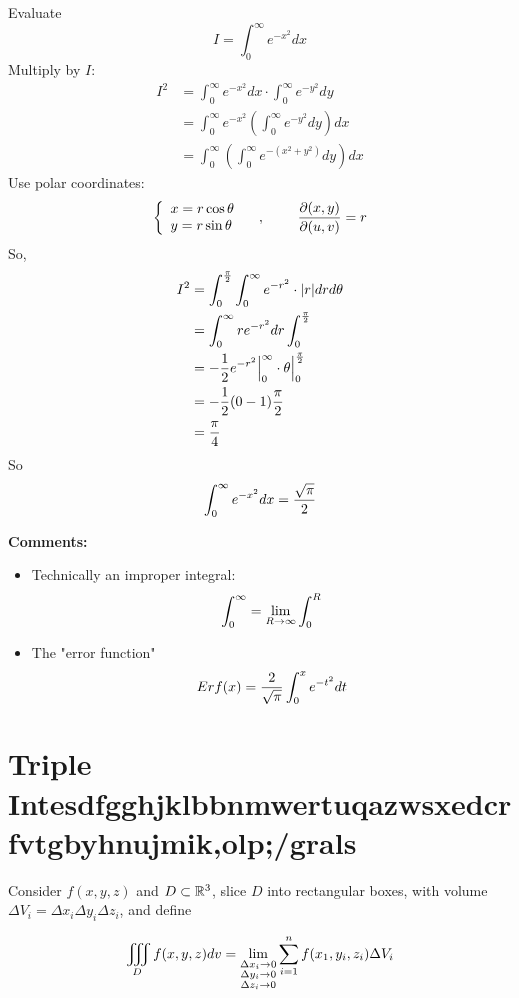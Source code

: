 \documentclass[english, 11pt]{article}
\begin{document}
\begin{exmp}
  Evaluate
  \[ I = \int_0^{\infty} e^{-x^2} dx \]
  Multiply by $I$:
  \begin{align*}
    I^2 & =  \int_0^{\infty} e^{-x^2} dx \cdot  \int_0^{\infty} e^{-y^2} dy \\
    & = \int_0^{\infty} e^{-x^2} \left( \int_0^{\infty} e^{-y^2} dy \right) dx \\
    & = \int_0^{\infty} \left( \int_0^{\infty} e^{-(x^2 + y^2)} dy \right) dx
  \end{align*}
  Use polar coordinates:
  \[ \left\{ \begin{array}{lr} x = r\cos\theta & \mbox{} \\ y = r\sin\theta & \mbox{} \end{array} \right., \ \ \ \ \ \ \ \frac{\partial(x,y)}{\partial(u,v)} = r \]
  So,
  \begin{align*}
    I^2 & = \int_0^{\frac{\pi}{2}} \int_0^{\infty} e^{-r^2} \cdot |r| dr d\theta \\
        & = \int_0^{\infty}re^{-r^2}dr \int_0^{\frac{\pi}{2}} \\
        & = -\frac{1}{2}e^{-r^2}\Big|_0^{\infty} \cdot \theta \Big|_0^{\frac{\pi}{2}} \\
        & = -\frac{1}{2}(0 - 1)\frac{\pi}{2} \\
        & = \frac{\pi}{4}
  \end{align*}
  So \[ \int_0^{\infty} e^{-x^2} dx = \frac{\sqrt{\pi}}{2} \]
\end{exmp}

\textbf{Comments:}

\begin{itemize}
  \item Technically an improper integral:
  \[ \int_0^{\infty}= \lim_{R \rightarrow \infty} \int_0^R \]
  \item The "error function"
  \[ Erf(x) = \frac{2}{\sqrt{\pi}}\int_0^x e^{-t^2}dt  \]
\end{itemize}

\section{Triple Intesdfgghjklbbnmwertuqazwsxedcrfvtgbyhnujmik,olp;/grals}
\newcommand{\Iiint}{\iiint\displaylimits}
Consider $f(x,y,z)$ and $D\subset {\mathbb{R}}^3$, slice $D$ into rectangular boxes, with volume $\Delta V_i = \Delta x_i \Delta y_i \Delta z_i$, and define

\begin{defn}\label{triple integral}
\[ \Iiint_D f(x,y,z) dv = \lim_{\substack{\Delta x_i \ar 0 \\ \Delta y_i \ar 0\\ \Delta z_i \ar 0}} \sum_{i =1}^n f(x_1,y_i,z_i) \Delta V_i \]
\end{defn}
\end{document}

